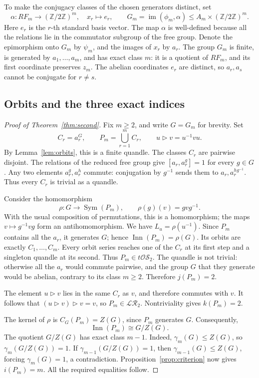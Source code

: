 \documentclass[11pt,a4paper]{article}
\theoremstyle{definition}
\theoremstyle{remark}
\newcommand{\LR}{\mathcal{LR}}
\newcommand{\tOS}{t\mathcal{OS}}
\newcommand{\Inn}{\operatorname{Inn}}
\newcommand{\Z}{\mathbb Z}
\newcommand{\conj}{\triangleright}
\begin{document}
To make the conjugacy classes of the chosen generators distinct, set
\[
 \alpha:RF_m\to(\Z/2\Z)^m,\quad x_r\mapsto e_r,\qquad
 G_m=\operatorname{im}(\phi_m,\alpha)
 \le A_m\times(\Z/2\Z)^m.
\]
Here \(e_r\) is the \(r\)-th standard basis vector.
The map \(\alpha\) is well-defined because all the relations
lie in the commutator subgroup of the free group.
Denote the epimorphism onto \(G_m\) by \(\psi_m\),
and the images of \(x_r\) by \(a_r\).
The group \(G_m\) is finite, is generated by \(a_1,\ldots,a_m\),
and has exact class \(m\):
it is a quotient of \(RF_m\), and its first coordinate preserves \(z_m\).
The abelian coordinates \(e_r\) are distinct,
so \(a_r,a_s\) cannot be conjugate for \(r\ne s\).

\subsection{Orbits and the three exact indices}

\begin{proof}[Proof of Theorem~\ref{thm:second}]
Fix \(m\ge2\), and write \(G=G_m\) for brevity.
Set
\[
 C_r=a_r^G,\qquad P_m=\bigcup_{r=1}^{m}C_r,\qquad
 u\conj v=u^{-1}vu.
\]
By Lemma~\ref{lem:orbits}, this is a finite quandle.
The classes \(C_r\) are pairwise disjoint.
The relations of the reduced free group give
\([a_r,a_r^g]=1\) for every \(g\in G\).
Any two elements \(a_r^g,a_r^h\) commute:
conjugation by \(g^{-1}\) sends them to \(a_r,a_r^{hg^{-1}}\).
Thus every \(C_r\) is trivial as a quandle.

Consider the homomorphism
\[
 \rho:G\to\operatorname{Sym}(P_m),\qquad
 \rho(g)(v)=gvg^{-1}.
\]
With the usual composition of permutations, this is a homomorphism;
the maps \(v\mapsto g^{-1}vg\) form an antihomomorphism.
We have \(L_u=\rho(u^{-1})\).
Since \(P_m\) contains all the \(a_r\), it generates \(G\);
hence \(\Inn(P_m)=\rho(G)\).
Its orbits are exactly \(C_1,\ldots,C_m\).
Every orbit series reaches one of the \(C_r\) at its first step
and a singleton quandle at its second.
Thus \(P_m\in\tOS_2\).
The quandle is not trivial: otherwise all the \(a_r\) would
commute pairwise, and the group \(G\) that they generate would be abelian,
contrary to its class \(m\ge2\).
Therefore \(j(P_m)=2\).

The element \(u\conj v\) lies in the same \(C_r\) as \(v\),
and therefore commutes with \(v\).
It follows that \((u\conj v)\conj v=v\), so \(P_m\in\LR_2\).
Nontriviality gives \(k(P_m)=2\).

The kernel of \(\rho\) is \(C_G(P_m)=Z(G)\),
since \(P_m\) generates \(G\).
Consequently,
\[
 \Inn(P_m)\cong G/Z(G).
\]
The quotient \(G/Z(G)\) has exact class \(m-1\).
Indeed, \(\gamma_m(G)\le Z(G)\), so \(\gamma_m(G/Z(G))=1\).
If \(\gamma_{m-1}(G/Z(G))=1\), then
\(\gamma_{m-1}(G)\le Z(G)\), forcing \(\gamma_m(G)=1\),
a contradiction.
Proposition~\ref{prop:criterion} now gives \(i(P_m)=m\).
All the required equalities follow.
\end{proof}
\end{document}
